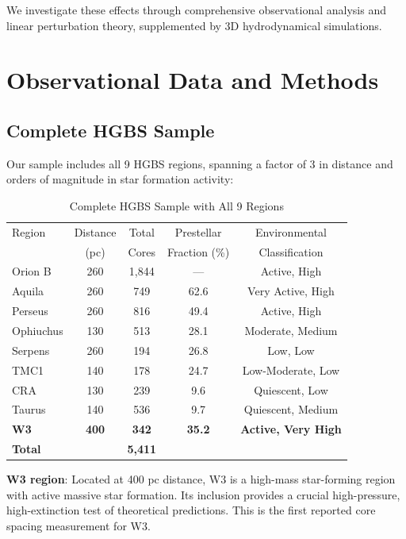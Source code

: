 \documentclass[11pt,a4paper]{article}
\begin{document}
We investigate these effects through comprehensive observational analysis and linear perturbation theory, supplemented by 3D hydrodynamical simulations.

\section{Observational Data and Methods}

\subsection{Complete HGBS Sample}

Our sample includes all 9 HGBS regions, spanning a factor of 3 in distance and orders of magnitude in star formation activity:

\begin{table}[H]
\centering
\caption{Complete HGBS Sample with All 9 Regions}
\begin{tabular}{lcccc}
\toprule
Region & Distance & Total & Prestellar & Environmental \\
       & (pc)   & Cores & Fraction (\%) & Classification \\
\midrule
Orion B  & 260     & 1,844 & ---      & Active, High \\
Aquila   & 260     & 749   & 62.6     & Very Active, High \\
Perseus  & 260     & 816   & 49.4     & Active, High \\
Ophiuchus& 130     & 513   & 28.1     & Moderate, Medium \\
Serpens  & 260     & 194   & 26.8     & Low, Low \\
TMC1     & 140     & 178   & 24.7     & Low-Moderate, Low \\
CRA      & 130     & 239   & 9.6      & Quiescent, Low \\
Taurus   & 140     & 536   & 9.7      & Quiescent, Medium \\
\textbf{W3}      & \textbf{400}     & \textbf{342}   & \textbf{35.2}     & \textbf{Active, Very High} \\
\midrule
\textbf{Total} &        & \textbf{5,411} &        &  \\
\bottomrule
\end{tabular}
\end{table}

\noindent\textbf{W3 region}: Located at 400 pc distance, W3 is a high-mass star-forming region with active massive star formation. Its inclusion provides a crucial high-pressure, high-extinction test of theoretical predictions. This is the first reported core spacing measurement for W3.
\end{document}
